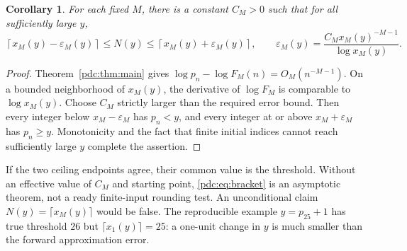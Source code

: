 \documentclass[11pt,letterpaper]{article}
\newtheorem{corollary}[theorem]{Corollary}
\theoremstyle{remark}\newtheorem{remark}[theorem]{Remark}
\begin{document}
\begin{corollary}\label{pdc:cor:threshold}
For each fixed $M$, there is a constant $C_M>0$ such that for all sufficiently large $y$,
\begin{equation}\label{pdc:eq:bracket}
 \left\lceil x_M(y)-\varepsilon_M(y)\right\rceil
 \leq N(y)\leq
 \left\lceil x_M(y)+\varepsilon_M(y)\right\rceil,
 \qquad
 \varepsilon_M(y)=\frac{C_M x_M(y)^{-M-1}}{\log x_M(y)}.
\end{equation}
\end{corollary}
\begin{proof}
Theorem~\ref{pdc:thm:main} gives $\log p_n-\log F_M(n)=O_M(n^{-M-1})$. On a bounded neighborhood of $x_M(y)$, the derivative of $\log F_M$ is comparable to $\log x_M(y)$. Choose $C_M$ strictly larger than the required error bound. Then every integer below $x_M-\varepsilon_M$ has $p_n<y$, and every integer at or above $x_M+\varepsilon_M$ has $p_n\geq y$. Monotonicity and the fact that finite initial indices cannot reach sufficiently large $y$ complete the assertion.
\end{proof}
If the two ceiling endpoints agree, their common value is the threshold. Without an effective value of $C_M$ and starting point, \eqref{pdc:eq:bracket} is an asymptotic theorem, not a ready finite-input rounding test. An unconditional claim $N(y)=\lceil x_M(y)\rceil$ would be false. The reproducible example $y=p_{25}+1$ has true threshold $26$ but $\lceil x_1(y)\rceil=25$: a one-unit change in $y$ is much smaller than the forward approximation error.
\end{document}
